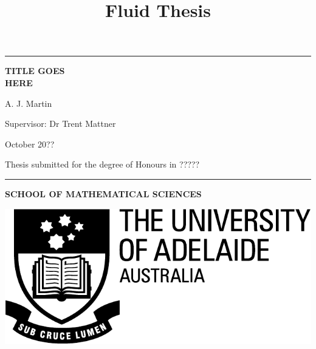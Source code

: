 \documentclass{X:/Documents/Coding/Latex/myreport}
\title{Fluid Thesis}
\theoremstyle{plain}
\theoremstyle{definition}
\theoremstyle{remark}
\numberwithin{equation}{section}
\numberwithin{figure}{section}
\begin{document}
%
%
\begin{titlepage}
\begin{flushleft}
\hrule
\vspace{1 cm}


{\huge{\bf TITLE GOES \\[15pt] HERE}}
\vspace*{2cm}




\vspace{1 cm}
{\large A. J. Martin}

\vspace{0.5 cm}

{\large Supervisor: Dr Trent Mattner}

\vspace{0.5 cm}

{October 20??}

\vspace{2.5 cm}

{ Thesis submitted for the degree of Honours in ?????}



\vspace{10 cm}


\hrule


\end{flushleft}
\begin{flushleft}
\textbf{\textsf{SCHOOL OF MATHEMATICAL SCIENCES}}
\end{flushleft}


\vspace{-1cm}
%
%

%
\begin{flushright}
\includegraphics[scale=0.25]{ua_crest.pdf}
\end{flushright}
\vspace{-2 cm}

\end{titlepage}
\end{document}
